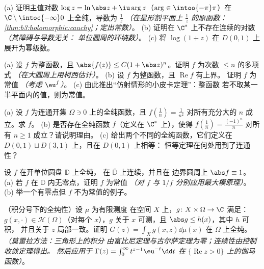 \begin{exercise}[$\star\star$]\label{exo:b3:holomorphic:3}
(a) 证明主值对数 $\log z = \ln\abs z +
\iu\arg z$（$\arg \in \intoo{-\pi}\pi$）在
$\C\setminus\intoc{-\infty}0$ 上全纯，导数为 $\frac1z$
\emph{（在星形割平面上 $\frac1z$ 的原函数：
\cref{thm:b3:holomorphic:cauchy}；定出常数）}。
(b) 证明在
$\C^*$ 上不存在连续的对数 \emph{（其障碍与导数无关：
单位圆周的环绕数）}。
(c) 将 $\log(1 + z)$ 在 $D(0,1)$ 上展开为幂级数。
\end{exercise}

\begin{exercise}[$\star\star$]\label{exo:b3:holomorphic:4}
(a) 设 $f$ 为整函数，且 $\abs{f(z)} \leq C(1 + \abs
z)^{n}$。证明 $f$ 为次数 $\leq n$ 的多项式
\emph{（在大圆周上用柯西估计）}。
(b) 设 $f$ 为整函数，且 $\operatorname{Re}f$ 有上界。
证明 $f$ 为常值 \emph{（考虑 $\eu^{f}$）}。
(c) 由此推出“仿射情形的小皮卡定理”：整函数
若不取某一半平面内的值，则为常值。
\end{exercise}

\begin{exercise}[$\star\star$]\label{exo:b3:holomorphic:5}
(a) 设 $f$ 为连通开集 $\Omega \ni 0$ 上的全纯函数，且
$f(\frac1n) = \frac1{n^2}$ 对所有充分大的 $n$ 成立。求 $f$。
(b) 是否存在全纯函数 $f$（定义在 $\C^*$ 上），使得 $f(\frac1n) =
\frac{(-1)^n}{n}$ 对所有 $n \geq 1$ 成立？请说明理由。
(c) 给出两个不同的全纯函数，它们定义在
$D(0,1)\sqcup D(3,1)$ 上，且在 $D(0,1)$ 上相等：
恒等定理在何处用到了连通性？
\end{exercise}

\begin{exercise}[$\star\star$]\label{exo:b3:holomorphic:6}
设 $f$ 在开单位圆盘 $\mathbb D$ 上全纯，
在 $\bar{\mathbb D}$ 上连续，并且在
边界圆周上 $\abs f \equiv 1$。
(a) 若 $f$ 在 $\mathbb D$ 内无零点，证明 $f$ 为常值
\emph{（对 $f$ 与 $1/f$ 分别应用最大模原理）}。
(b) 举一个有零点但 $f$ 不为常值的例子。
\end{exercise}

\begin{exercise}[$\star\star$]\label{exo:b3:holomorphic:7}
（积分号下的全纯性）设 $\mu$ 为有限测度
在空间 $X$ 上，$g \colon X\times\Omega \to \C$ 满足：
$g(x, \cdot) \in \mathcal H(\Omega)$（对每个 $x$），$g$
关于 $x$ 可测，且 $\abs g \leq h(x)$，其中 $h$ 可积，
并且关于 $z$ 局部一致。证明 $G(z) = \int_Xg(x, z)\dd\mu(x)$
在 $\Omega$ 上全纯。\emph{（莫雷拉方法：三角形上的积分
由富比尼定理与古尔萨定理为零；连续性由控制收敛定理得出。
然后应用于 $\Gamma(z) =
\int_0^\infty t^{z-1}\eu^{-t}\dd t$ 在 $\{\operatorname{Re}z >
0\}$ 上的伽马函数）}。
\end{exercise}

